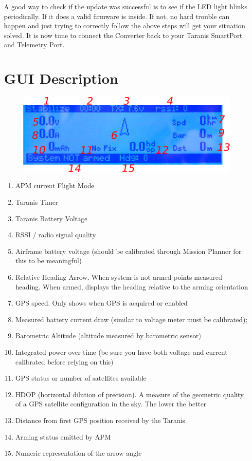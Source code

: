\documentclass[english]{article}
\begin{document}
A good way to check if the update was successful is to see if the LED light blinks periodically. If it does a valid firmware is inside. If not, no hard trouble can happen and just trying to correctly follow the above steps will get your situation solved. It is now time to connect the Converter back to your Taranis SmartPort and Telemetry Port.

\section{GUI Description}

\begin{figure}[h!]
	\centering
	\includegraphics{LCD Description}
\end{figure}

\begin{enumerate}

\item APM current Flight Mode
\item Taranis Timer
\item Taranis Battery Voltage
\item RSSI / radio signal quality
\item Airframe battery voltage (should be calibrated through Mission Planner for this to be meaningful)
\item Relative Heading Arrow. When system is not armed points measured heading. When armed, displays the heading relative to the arming orientation
\item GPS speed. Only shows when GPS is acquired or enabled
\item Measured battery current draw (similar to voltage meter must be calibrated);
\item Barometric Altitude (altitude measured by barometric sensor)
\item Integrated power over time (be sure you have both voltage and current calibrated before relying on this)
\item GPS status or number of satellites available
\item HDOP (horizontal dilution of precision). A measure of the geometric quality of a GPS satellite configuration in the sky. The lower the better
\item Distance from first GPS position received by the Taranis
\item Arming status emitted by APM
\item Numeric representation of the arrow angle

\end{enumerate}
\end{document}
